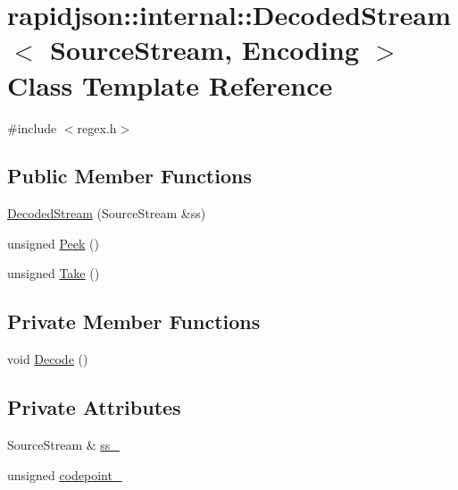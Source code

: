 \hypertarget{classrapidjson_1_1internal_1_1_decoded_stream}{}\section{rapidjson\+::internal\+::Decoded\+Stream$<$ Source\+Stream, Encoding $>$ Class Template Reference}
\label{classrapidjson_1_1internal_1_1_decoded_stream}


{\ttfamily \#include $<$regex.\+h$>$}

\subsection*{Public Member Functions}
\begin{DoxyCompactItemize}
\item 
\mbox{\hyperlink{classrapidjson_1_1internal_1_1_decoded_stream_ac8562bb70e02fd6cf179917fb244ea04}{Decoded\+Stream}} (Source\+Stream \&ss)
\item 
unsigned \mbox{\hyperlink{classrapidjson_1_1internal_1_1_decoded_stream_a28a389478d1981546e6259c8cf0f2377}{Peek}} ()
\item 
unsigned \mbox{\hyperlink{classrapidjson_1_1internal_1_1_decoded_stream_a1fd014dd83e153369ecad40886093685}{Take}} ()
\end{DoxyCompactItemize}
\subsection*{Private Member Functions}
\begin{DoxyCompactItemize}
\item 
void \mbox{\hyperlink{classrapidjson_1_1internal_1_1_decoded_stream_a42d12efc1b9b4dca1214e01326e693cf}{Decode}} ()
\end{DoxyCompactItemize}
\subsection*{Private Attributes}
\begin{DoxyCompactItemize}
\item 
Source\+Stream \& \mbox{\hyperlink{classrapidjson_1_1internal_1_1_decoded_stream_a3ea2b140a9dac55ea82ad7423454139f}{ss\+\_\+}}
\item 
unsigned \mbox{\hyperlink{classrapidjson_1_1internal_1_1_decoded_stream_a3a10e5ba9d127706d9168e2ce6d3811c}{codepoint\+\_\+}}
\end{DoxyCompactItemize}


